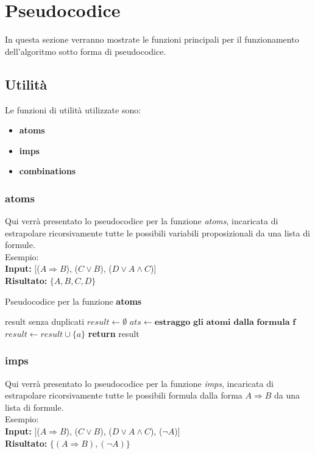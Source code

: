 \documentclass[\main/tesi.tex]{subfiles}
\begin{document}
\chapter{Pseudocodice}

In questa sezione verranno mostrate le funzioni principali per il funzionamento dell'algoritmo sotto forma di pseudocodice.

\section{Utilità}

Le funzioni di utilità utilizzate sono:
\begin{itemize}
    \item \textbf{atoms}
    \item \textbf{imps}
    \item \textbf{combinations}
\end{itemize}

\subsection{atoms}
Qui verrà presentato lo pseudocodice per la funzione \textit{atoms}, incaricata di estrapolare ricorsivamente tutte le possibili variabili proposizionali da una lista di formule. \\
Esempio: \\
\textbf{Input:} [($A \Rightarrow B$), ($C \lor B$), ($D \lor A \land C$)] \\
\textbf{Risultato:} $\{A, B, C, D\}$

\begin{algorithm}
    \caption{Pseudocodice per la funzione \textbf{atoms}}\label{alg:atoms}
    \begin{algorithmic}
        \Ensure result senza duplicati
        \State $result \gets \emptyset$
        \State $ats \gets \textbf{estraggo gli atomi dalla formula f}$
        \State $result \gets result \cup \{a\}$
        \EndIf
        \EndFor
        \EndFor
        \State \textbf{return} result
        \EndFunction
    \end{algorithmic}
\end{algorithm}

\subsection{imps}
Qui verrà presentato lo pseudocodice per la funzione \textit{imps}, incaricata di estrapolare ricorsivamente tutte le possibili formula dalla forma $A \Rightarrow B$ da una lista di formule. \\
Esempio: \\
\textbf{Input:} [($A \Rightarrow B$), ($C \lor B$), ($D \lor A \land C$), ($\neg A$)] \\
\textbf{Risultato:} $\{(A \Rightarrow B), (\neg A)\}$
\end{document}
